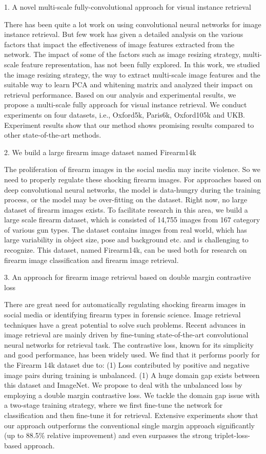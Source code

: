 1. A novel multi-scale fully-convolutional approach for visual instance retrieval

There has been quite a lot work on using convolutional neural networks for image instance retrieval. But few work has given a detailed analysis on the various factors that impact the effectiveness of image features extracted from the network. The impact of some of the factors such as image resizing strategy, multi-scale feature representation, has not been fully explored. In this work, we studied the image resizing strategy, the way to extract multi-scale image features and the suitable way to learn PCA and whitening matrix and analyzed their impact on retrieval performance. Based on our analysis and experimental results, we propose a multi-scale fully approach for visual instance retrieval. We conduct experiments on four datasets, i.e., Oxford5k, Paris6k, Oxford105k and UKB. Experiment results show that our method shows promising results compared to other state-of-the-art methods.

2. We build a large firearm image dataset named Firearm14k

The proliferation of firearm images in the social media may incite violence. So we need to properly regulate these shocking firearm images. For approaches based on deep convolutional neural networks, the model is data-hungry during the training process, or the model may be over-fitting on the dataset. Right now, no large dataset of firearm images exists. To facilitate research in this area, we build a large scale firearm dataset, which is consisted of 14,755 images from 167 category of various gun types. The dataset contains images from real world, which has large variability in object size, pose and background etc. and is challenging to recognize. This dataset, named Firearm14k, can be used both for research on firearm image classification and firearm image retrieval.

3. An approach for firearm image retrieval based on double margin contrastive loss

There are great need for automatically regulating shocking firearm images in social media or identifying firearm types in forensic science. Image retrieval techniques have a great potential to solve such problems. Recent advances in image retrieval are mainly driven by fine-tuning state-of-the-art convolutional neural networks for retrieval task. The contrastive loss, known for its simplicity and good performance, has been widely used. We find that it performs poorly for the Firearm 14k dataset due to: (1) Loss contributed by positive and negative image pairs during training is unbalanced. (1) A huge domain gap exists between this dataset and ImageNet. We propose to deal with the unbalanced loss by employing a double margin contrastive loss. We tackle the domain gap issue with a two-stage training strategy, where we first fine-tune the network for classification and then fine-tune it for retrieval. Extensive experiments show that our approach outperforms the conventional single margin approach significantly (up to 88.5\% relative improvement) and even surpasses the strong triplet-loss-based approach.





